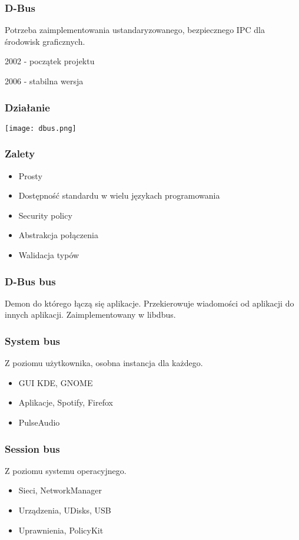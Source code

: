 \begin{frame}
    \frametitle{D-Bus}
    Potrzeba zaimplementowania ustandaryzowanego,
    bezpiecznego IPC dla
    środowisk graficznych.

    2002 - początek projektu

    2006 - stabilna wersja
\end{frame}

\begin{frame}
    \frametitle{Działanie}
    \texttt{[image: dbus.png]}
\end{frame}

\begin{frame}
    \frametitle{Zalety}
    \begin{itemize}
        \item Prosty
        \item Dostępność standardu w wielu językach programowania
        \item Security policy
        \item Abstrakcja połączenia
        \item Walidacja typów
    \end{itemize}
\end{frame}

\begin{frame}
    \frametitle{D-Bus bus}
    Demon do którego łączą się aplikacje. Przekierowuje
    wiadomości od aplikacji do innych aplikacji. Zaimplementowany
    w libdbus.
\end{frame}


\begin{frame}
    \frametitle{System bus}
    Z poziomu użytkownika, osobna instancja dla każdego.
    \begin{itemize}
        \item GUI KDE, GNOME
        \item Aplikacje, Spotify, Firefox
        \item PulseAudio
    \end{itemize}
\end{frame}

\begin{frame}
    \frametitle{Session bus}
    Z poziomu systemu operacyjnego.
    \begin{itemize}
        \item Sieci, NetworkManager
        \item Urządzenia, UDisks, USB
        \item Uprawnienia, PolicyKit
    \end{itemize}
\end{frame}

